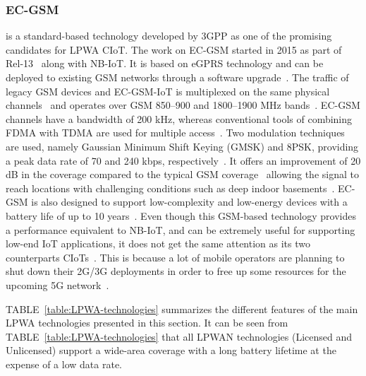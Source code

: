 \documentclass[]{IEEEtran}
\begin{document}
\subsubsection{EC-GSM}
\label{sec:2-2-3}
is a standard-based technology developed by 3GPP as one of the promising candidates for LPWA CIoT.
The work on EC-GSM started in 2015 as part of Rel-13~\cite{TR_45.820} along with NB-IoT.
It is based on eGPRS technology and can be deployed to existing GSM networks through a software upgrade~\cite{poursafar2017long}.
The traffic of legacy GSM devices and EC-GSM-IoT is multiplexed on the same physical channels~\cite{chaudhari2020lpwan} and operates over GSM 850–900 and 1800–1900 MHz bands~\cite{herrero_fundamentals_2021}.
EC-GSM channels have a bandwidth of 200 kHz, whereas conventional tools of combining FDMA with TDMA are used for multiple access~\cite{liberg_cellular_2019}.
Two modulation techniques are used, namely Gaussian Minimum Shift Keying (GMSK) and 8PSK, providing a peak data rate of 70 and 240 kbps, respectively~\cite{raza2017low}.
It offers an improvement of 20 dB in the coverage compared to the typical GSM coverage~\cite{hwang_survey_2019} allowing the signal to reach locations with challenging conditions such as deep indoor basements~\cite{chaudhari2020lpwan}.
EC-GSM is also designed to support low-complexity and low-energy devices with a battery life of up to 10 years~\cite{poursafar2017long}.
Even though this GSM-based technology provides a performance equivalent to NB-IoT, and can be extremely useful for supporting low-end IoT applications, it does not get the same attention as its two counterparts CIoTs~\cite{foubert2020long}.
This is because a lot of mobile operators are planning to shut down their 2G/3G deployments in order to free up some resources for the upcoming 5G network~\cite{noauthor_complete_2019}.

TABLE~\ref{table:LPWA-technologies} summarizes the different features of the main LPWA technologies presented in this section.
It can be seen from TABLE~\ref{table:LPWA-technologies} that all LPWAN technologies (Licensed and Unlicensed) support a wide-area coverage with a long battery lifetime at the expense of a low data rate.
\end{document}
